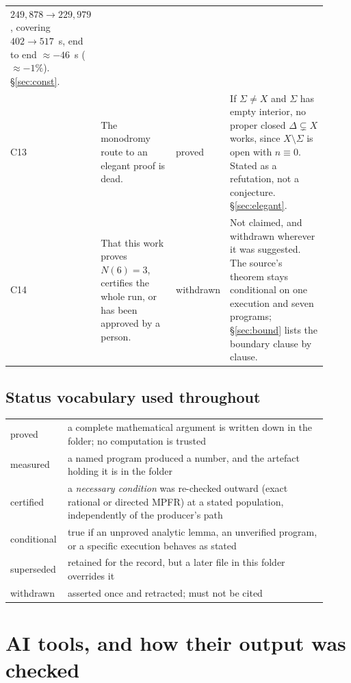 \documentclass[10pt]{article}
\theoremstyle{definition}
\newcommand{\status}[1]{\textsf{\small #1}}
\begin{document}
{\begin{longtable}{@{}L{0.045\linewidth}L{0.315\linewidth}L{0.105\linewidth}L{0.455\linewidth}@{}}
$249{,}878\to229{,}979$, covering $402\to517$~s, end to end $\approx-46$~s ($\approx-1\%$). \S\ref{sec:const}. \\
C13 & The monodromy route to an elegant proof is dead. &
\status{proved} &
If $\Sigma\ne X$ and $\Sigma$ has empty interior, no proper closed $\Delta\subsetneq X$ works, since
$X\setminus\Sigma$ is open with $n\equiv0$. Stated as a refutation, not a conjecture. \S\ref{sec:elegant}. \\
C14 & That this work proves $N(6)=3$, certifies the whole run, or has been approved by a person. &
\status{withdrawn} &
Not claimed, and withdrawn wherever it was suggested. The source's theorem stays conditional on one
execution and seven programs; \S\ref{sec:bound} lists the boundary clause by clause. \\
\bottomrule
\end{longtable}
}

\subsection*{Status vocabulary used throughout}
\begin{center}
\small
\begin{tabular}{@{}p{0.13\linewidth}p{0.79\linewidth}@{}}
\toprule
\status{proved} & a complete mathematical argument is written down in the folder; no computation is trusted \\
\status{measured} & a named program produced a number, and the artefact holding it is in the folder \\
\status{certified} & a \emph{${}$necessary condition} was re-checked outward (exact rational or directed
MPFR) at a stated population, independently of the producer's path \\
\status{conditional} & true if an unproved analytic lemma, an unverified program, or a specific execution behaves as stated \\
\status{superseded} & retained for the record, but a later file in this folder overrides it \\
\status{withdrawn} & asserted once and retracted; must not be cited \\
\bottomrule
\end{tabular}
\end{center}

\section{AI tools, and how their output was checked}\label{sec:ai}
\end{document}
